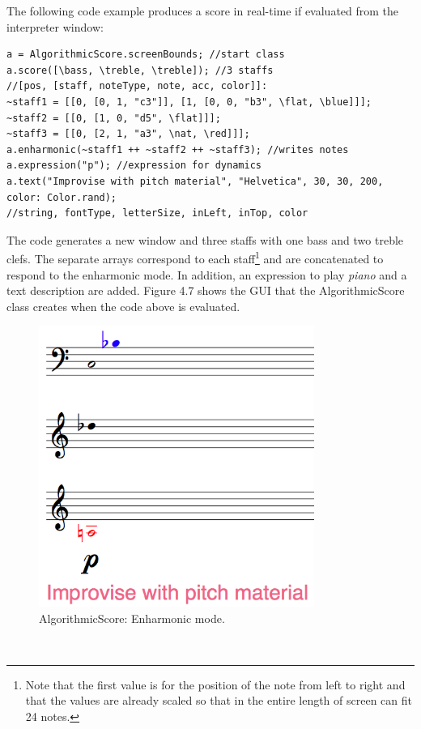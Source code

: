 The following code example produces a score in real-time if evaluated from the interpreter window: 
\begin{verbatim}
a = AlgorithmicScore.screenBounds; //start class
a.score([\bass, \treble, \treble]); //3 staffs
//[pos, [staff, noteType, note, acc, color]]:
~staff1 = [[0, [0, 1, "c3"]], [1, [0, 0, "b3", \flat, \blue]]]; 
~staff2 = [[0, [1, 0, "d5", \flat]]];
~staff3 = [[0, [2, 1, "a3", \nat, \red]]];
a.enharmonic(~staff1 ++ ~staff2 ++ ~staff3); //writes notes
a.expression("p"); //expression for dynamics
a.text("Improvise with pitch material", "Helvetica", 30, 30, 200, color: Color.rand);
//string, fontType, letterSize, inLeft, inTop, color  
\end{verbatim}
The code generates a new window and three staffs with one bass and two treble clefs. The separate arrays correspond to each staff\footnote{Note that the first value is for the position of the note from left to right and that the values are already scaled so that in the entire length of screen can fit 24 notes.} and are concatenated to respond to the enharmonic mode. In addition, an expression to play \emph{piano} and a text description are added. Figure 4.7 shows the GUI that the AlgorithmicScore class creates when the code above is evaluated. 
\begin{figure}[htbp] %
   \centering
   \includegraphics[width=9cm]{Chapter6/algoscore1.tif} %
   \caption{AlgorithmicScore: Enharmonic mode.}
   \label{fig:example}
\end{figure}\

